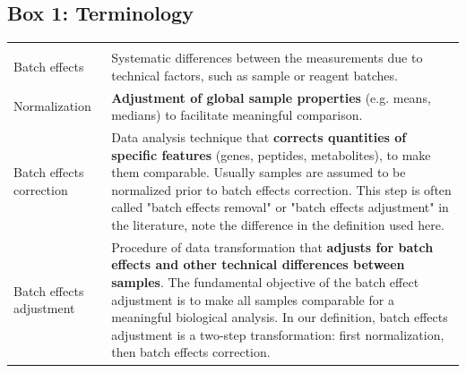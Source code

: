 \documentclass[num-refs]{wiley-article}
\begin{document}
\begin{table}[ht]
\begin{tcolorbox}
	\section*{Box 1: Terminology}
	\label{box:Box1_definitions}
	\begin{tabular}{>{\raggedright}p{2cm}m{10.5cm}}
		\headrow
		\thead{Term} & \thead{Definition} \\
		Batch effects & Systematic differences between the measurements due to technical factors, such as sample or reagent batches.  \\
		Normalization & \textbf{Adjustment of global sample properties} (e.g. means, medians) to facilitate meaningful comparison. \\
		Batch effects correction & Data analysis technique that \textbf{corrects quantities of specific features} (genes, peptides, metabolites), to make them comparable. Usually samples are assumed to be normalized prior to batch effects correction. This step is often called "batch effects removal" or "batch effects adjustment" in the literature, note the difference in the definition used here. \\
		Batch effects adjustment & Procedure of data transformation that \textbf{adjusts for batch effects and other technical differences between samples}. The fundamental objective of the batch effect adjustment is to make all samples comparable for a meaningful biological analysis. In our definition, batch effects adjustment is a two-step transformation: first normalization, then batch effects correction. \\
		\hline  %
	\end{tabular}
	
\end{tcolorbox}
\end{table}
\end{document}
